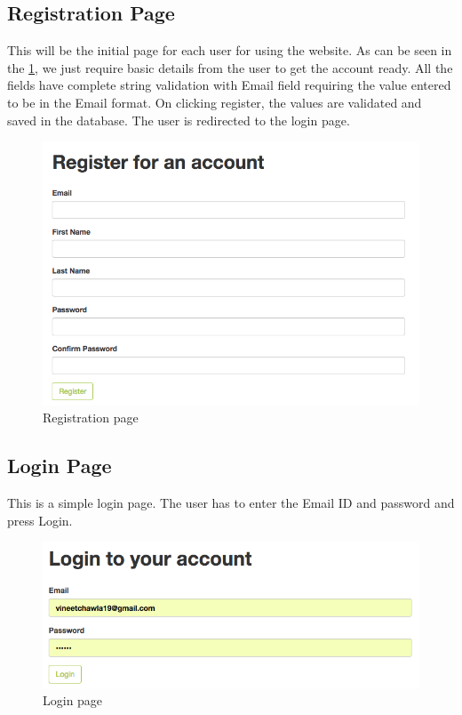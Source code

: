 \subsection{Registration Page}
This will be the initial page for each user for using the website. As can be seen in the \ref{fig:reg_page}, we just require basic details from the user to get the account ready. All the fields have complete string validation with Email field requiring the value entered to be in the Email format. On clicking register, the values are validated and saved in the database. The user is redirected to the login page.

\begin{figure}[h]
    \centering
    \includegraphics[width=\textwidth]{Figures/registration_page.png}
    \caption{Registration page}
    \label{fig:reg_page}
\end{figure}

\subsection{Login Page}
This is a simple login page. The user has to enter the Email ID and password and press Login. 
\begin{figure}[h]
    \centering
    \includegraphics[width=\textwidth]{Figures/login_page.png}
    \caption{Login page}
    \label{fig:login_page}
\end{figure}

